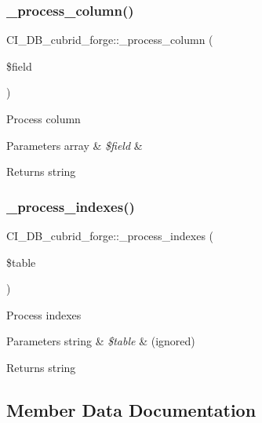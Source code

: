 \subsubsection{\texorpdfstring{\+\_\+process\+\_\+column()}{\_process\_column()}}
{\footnotesize\ttfamily C\+I\+\_\+\+D\+B\+\_\+cubrid\+\_\+forge\+::\+\_\+process\+\_\+column (\begin{DoxyParamCaption}\item[{}]{\$field }\end{DoxyParamCaption})\hspace{0.3cm}{\ttfamily [protected]}}

Process column


\begin{DoxyParams}[1]{Parameters}
array & {\em \$field} & \\
\hline
\end{DoxyParams}
\begin{DoxyReturn}{Returns}
string 
\end{DoxyReturn}
\mbox{\label{class_c_i___d_b__cubrid__forge_a170ca2c77a817a94b6d8903912995b7f}} 
\subsubsection{\texorpdfstring{\+\_\+process\+\_\+indexes()}{\_process\_indexes()}}
{\footnotesize\ttfamily C\+I\+\_\+\+D\+B\+\_\+cubrid\+\_\+forge\+::\+\_\+process\+\_\+indexes (\begin{DoxyParamCaption}\item[{}]{\$table }\end{DoxyParamCaption})\hspace{0.3cm}{\ttfamily [protected]}}

Process indexes


\begin{DoxyParams}[1]{Parameters}
string & {\em \$table} & (ignored) \\
\hline
\end{DoxyParams}
\begin{DoxyReturn}{Returns}
string 
\end{DoxyReturn}


\subsection{Member Data Documentation}
\mbox{\label{class_c_i___d_b__cubrid__forge_a8ddddecf7a8425af88138588968c7f41}} 
